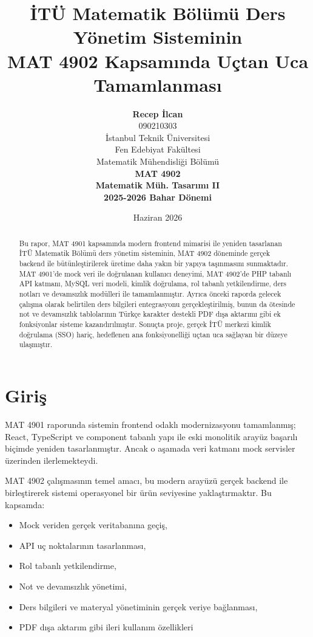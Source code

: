 \documentclass[12pt,a4paper]{article}
\title{İTÜ Matematik Bölümü Ders Yönetim Sisteminin\\
MAT 4902 Kapsamında Uçtan Uca Tamamlanması}
\author{
    \textbf{Recep İlcan}\\[0.5em]
    090210303\\[1.5em]
    İstanbul Teknik Üniversitesi\\
    Fen Edebiyat Fakültesi\\
    Matematik Mühendisliği Bölümü\\[1.5em]
    \textbf{MAT 4902}\\
    \textbf{Matematik Müh. Tasarımı II}\\
    \textbf{2025-2026 Bahar Dönemi}
}
\date{Haziran 2026}
\begin{document}
\maketitle

\begin{abstract}
Bu rapor, MAT 4901 kapsamında modern frontend mimarisi ile yeniden tasarlanan İTÜ Matematik Bölümü ders yönetim sisteminin, MAT 4902 döneminde gerçek backend ile bütünleştirilerek üretime daha yakın bir yapıya taşınmasını sunmaktadır. MAT 4901'de mock veri ile doğrulanan kullanıcı deneyimi, MAT 4902'de PHP tabanlı API katmanı, MySQL veri modeli, kimlik doğrulama, rol tabanlı yetkilendirme, ders notları ve devamsızlık modülleri ile tamamlanmıştır. Ayrıca önceki raporda gelecek çalışma olarak belirtilen ders bilgileri entegrasyonu gerçekleştirilmiş, bunun da ötesinde not ve devamsızlık tablolarının Türkçe karakter destekli PDF dışa aktarımı gibi ek fonksiyonlar sisteme kazandırılmıştır. Sonuçta proje, gerçek İTÜ merkezi kimlik doğrulama (SSO) hariç, hedeflenen ana fonksiyonelliği uçtan uca sağlayan bir düzeye ulaşmıştır.
\end{abstract}

\newpage
\tableofcontents
\newpage

\section{Giriş}
MAT 4901 raporunda sistemin frontend odaklı modernizasyonu tamamlanmış; React, TypeScript ve component tabanlı yapı ile eski monolitik arayüz başarılı biçimde yeniden tasarlanmıştır. Ancak o aşamada veri katmanı mock servisler üzerinden ilerlemekteydi.

MAT 4902 çalışmasının temel amacı, bu modern arayüzü gerçek backend ile birleştirerek sistemi operasyonel bir ürün seviyesine yaklaştırmaktır. Bu kapsamda:

\begin{itemize}[leftmargin=*]
    \item Mock veriden gerçek veritabanına geçiş,
    \item API uç noktalarının tasarlanması,
    \item Rol tabanlı yetkilendirme,
    \item Not ve devamsızlık yönetimi,
    \item Ders bilgileri ve materyal yönetiminin gerçek veriye bağlanması,
    \item PDF dışa aktarım gibi ileri kullanım özellikleri
\end{itemize}
\end{document}
